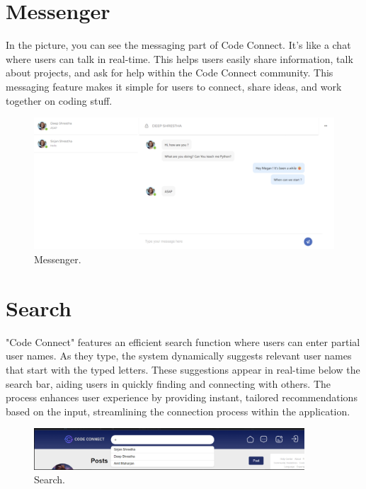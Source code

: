 \section{Messenger}
In the picture, you can see the messaging part of Code Connect. It's like a chat where users can talk in real-time. This helps users easily share information, talk about projects, and ask for help within the Code Connect community. This messaging feature makes it simple for users to connect, share ideas, and work together on coding stuff.
\begin{figure}[ht]
    \centering
    \includegraphics[width=1\textwidth]{Outcome-ss/messanger.png}
    \caption{Messenger.}
    \label{fig:Messenger}
\end{figure}

\section{Search}
"Code Connect" features an efficient search function where users can enter partial user names. As they type, the system dynamically suggests relevant user names that start with the typed letters. These suggestions appear in real-time below the search bar, aiding users in quickly finding and connecting with others. The process enhances user experience by providing instant, tailored recommendations based on the input, streamlining the connection process within the application.
\begin{figure}[ht]
    \centering
    \includegraphics[width=0.9\textwidth]{Outcome-ss/search.png}
    \caption{Search.}
    \label{fig:Search}
\end{figure}

